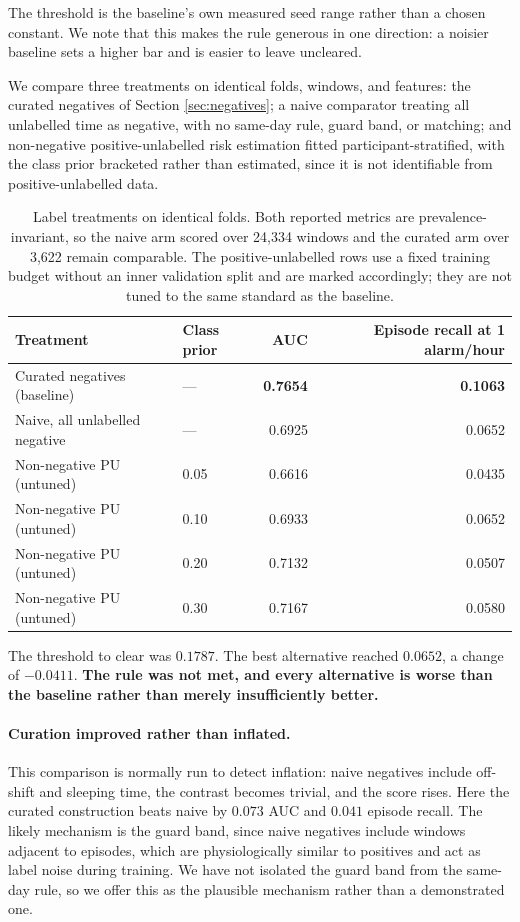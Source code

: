 \documentclass{article}
\begin{document}
The threshold is the baseline's own measured seed range rather than a chosen
constant. We note that this makes the rule generous in one direction: a noisier
baseline sets a higher bar and is easier to leave uncleared.

We compare three treatments on identical folds, windows, and features: the
curated negatives of Section \ref{sec:negatives}; a naive comparator treating
all unlabelled time as negative, with no same-day rule, guard band, or
matching; and non-negative positive-unlabelled risk estimation
\cite{kiryo2017} fitted participant-stratified, with the class prior bracketed
rather than estimated, since it is not identifiable from positive-unlabelled
data.

\begin{table}[t]
\caption{Label treatments on identical folds. Both reported metrics are
prevalence-invariant, so the naive arm scored over 24{,}334 windows and the
curated arm over 3{,}622 remain comparable. The positive-unlabelled rows use a
fixed training budget without an inner validation split and are marked
accordingly; they are not tuned to the same standard as the baseline.}
\label{tab:pu}
\centering
\begin{tabular}{llrr}
\toprule
Treatment & Class prior & AUC & Episode recall at 1 alarm/hour \\
\midrule
Curated negatives (baseline) & --- & \textbf{0.7654} & \textbf{0.1063} \\
Naive, all unlabelled negative & --- & 0.6925 & 0.0652 \\
Non-negative PU (untuned) & 0.05 & 0.6616 & 0.0435 \\
Non-negative PU (untuned) & 0.10 & 0.6933 & 0.0652 \\
Non-negative PU (untuned) & 0.20 & 0.7132 & 0.0507 \\
Non-negative PU (untuned) & 0.30 & 0.7167 & 0.0580 \\
\bottomrule
\end{tabular}
\end{table}

The threshold to clear was $0.1787$. The best alternative reached $0.0652$, a
change of $-0.0411$. \textbf{The rule was not met, and every alternative is
worse than the baseline rather than merely insufficiently better.}

\paragraph{Curation improved rather than inflated.} This comparison is normally
run to detect inflation: naive negatives include off-shift and sleeping time,
the contrast becomes trivial, and the score rises. Here the curated
construction beats naive by $0.073$ AUC and $0.041$ episode recall. The likely
mechanism is the guard band, since naive negatives include windows adjacent to
episodes, which are physiologically similar to positives and act as label noise
during training. We have not isolated the guard band from the same-day rule,
so we offer this as the plausible mechanism rather than a demonstrated one.
\end{document}
